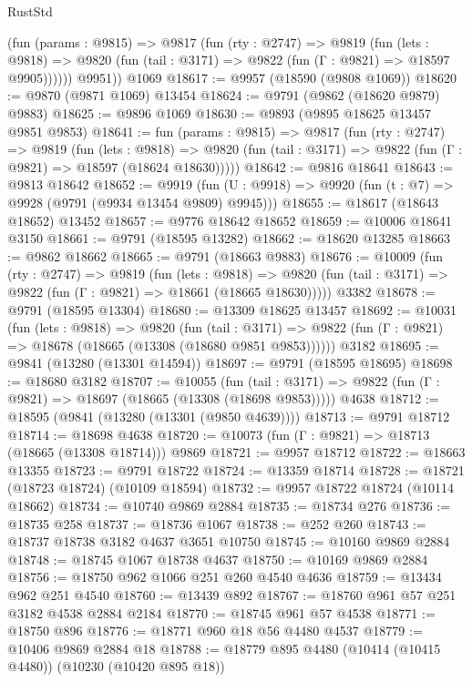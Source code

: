 \begin{lexlean}{RustStd}
\begin{coremodule}
          (fun (params : @9815) =>
          @9817
            (fun (rty : @2747) =>
            @9819
              (fun (lets : @9818) =>
              @9820 (fun (tail : @3171) => @9822 (fun (Γ : @9821) => @18597 @9905))))))
        @9951))
    @1069
@18617 := @9957 (@18590 (@9808 @1069))
@18620 := @9870 (@9871 @1069) @13454
@18624 := @9791 (@9862 (@18620 @9879) @9883)
@18625 := @9896 @1069
@18630 := @9893 (@9895 @18625 @13457 @9851 @9853)
@18641 := fun (params : @9815) =>
  @9817
    (fun (rty : @2747) =>
    @9819
      (fun (lets : @9818) =>
      @9820 (fun (tail : @3171) => @9822 (fun (Γ : @9821) => @18597 (@18624 @18630)))))
@18642 := @9816 @18641
@18643 := @9813 @18642
@18652 := @9919
    (fun (U : @9918) => @9920 (fun (t : @7) => @9928 (@9791 (@9934 @13454 @9809) @9945)))
@18655 := @18617 (@18643 @18652) @13452
@18657 := @9776 @18642 @18652
@18659 := @10006 @18641 @3150
@18661 := @9791 (@18595 @13282)
@18662 := @18620 @13285
@18663 := @9862 @18662
@18665 := @9791 (@18663 @9883)
@18676 := @10009
    (fun (rty : @2747) =>
    @9819
      (fun (lets : @9818) =>
      @9820 (fun (tail : @3171) => @9822 (fun (Γ : @9821) => @18661 (@18665 @18630)))))
    @3382
@18678 := @9791 (@18595 @13304)
@18680 := @13309 @18625 @13457
@18692 := @10031
    (fun (lets : @9818) =>
    @9820
      (fun (tail : @3171) =>
      @9822 (fun (Γ : @9821) => @18678 (@18665 (@13308 (@18680 @9851 @9853))))))
    @3182
@18695 := @9841 (@13280 (@13301 @14594))
@18697 := @9791 (@18595 @18695)
@18698 := @18680 @3182
@18707 := @10055
    (fun (tail : @3171) => @9822 (fun (Γ : @9821) => @18697 (@18665 (@13308 (@18698 @9853)))))
    @4638
@18712 := @18595 (@9841 (@13280 (@13301 (@9850 @4639))))
@18713 := @9791 @18712
@18714 := @18698 @4638
@18720 := @10073 (fun (Γ : @9821) => @18713 (@18665 (@13308 @18714))) @9869
@18721 := @9957 @18712
@18722 := @18663 @13355
@18723 := @9791 @18722
@18724 := @13359 @18714
@18728 := @18721 (@18723 @18724) (@10109 @18594)
@18732 := @9957 @18722 @18724 (@10114 @18662)
@18734 := @10740 @9869 @2884
@18735 := @18734 @276
@18736 := @18735 @258
@18737 := @18736 @1067
@18738 := @252 @260
@18743 := @18737 @18738 @3182 @4637 @3651 @10750
@18745 := @10160 @9869 @2884
@18748 := @18745 @1067 @18738 @4637
@18750 := @10169 @9869 @2884
@18756 := @18750 @962 @1066 @251 @260 @4540 @4636
@18759 := @13434 @962 @251 @4540
@18760 := @13439 @892
@18767 := @18760 @961 @57 @251 @3182 @4538 @2884 @2184
@18770 := @18745 @961 @57 @4538
@18771 := @18750 @896
@18776 := @18771 @960 @18 @56 @4480 @4537
@18779 := @10406 @9869 @2884 @18
@18788 := @18779 @895 @4480 (@10414 (@10415 @4480)) (@10230 (@10420 @895 @18))

\end{coremodule}
\end{lexlean}

